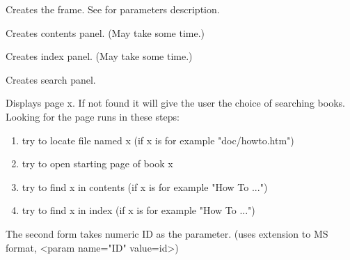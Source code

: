 \label{wxhtmlhelpframecreate}


Creates the frame. See 
for parameters description.

\label{wxhtmlhelpframecreatecontents}


Creates contents panel. (May take some time.)

\label{wxhtmlhelpframecreateindex}


Creates index panel. (May take some time.)

\label{wxhtmlhelpframecreatesearch}


Creates search panel.

\label{wxhtmlhelpframedisplay}



Displays page x. If not found it will give the user the choice of
searching books.
Looking for the page runs in these steps:

\begin{enumerate}\itemsep=0pt
\item try to locate file named x (if x is for example "doc/howto.htm")
\item try to open starting page of book x
\item try to find x in contents (if x is for example "How To ...")
\item try to find x in index (if x is for example "How To ...")
\end{enumerate}

The second form takes numeric ID as the parameter.
(uses extension to MS format, <param name="ID" value=id>)



